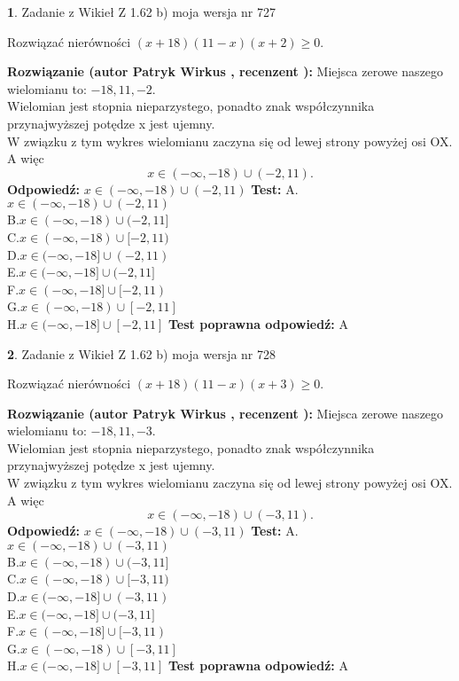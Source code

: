 \documentclass[12pt, a4paper]{article}
\theoremstyle{definition} %
\newtheorem{zad}{}
\newcommand{\zadStart}[1]{\begin{zad}#1\newline}
\newcommand{\zadStop}{\end{zad}}
\newcommand{\rozwStart}[2]{\noindent \textbf{Rozwiązanie (autor #1 , recenzent #2): }\newline}
\newcommand{\rozwStop}{\newline}
\newcommand{\odpStart}{\noindent \textbf{Odpowiedź:}\newline}
\newcommand{\odpStop}{\newline}
\newcommand{\testStart}{\noindent \textbf{Test:}\newline}
\newcommand{\testStop}{\newline}
\newcommand{\kluczStart}{\noindent \textbf{Test poprawna odpowiedź:}\newline}
\newcommand{\kluczStop}{\newline}
\begin{document}
\zadStart{Zadanie z Wikieł Z 1.62 b) moja wersja nr 727}

Rozwiązać nierówności $(x+18)(11-x)(x+2)\ge0$.
\zadStop
\rozwStart{Patryk Wirkus}{}
Miejsca zerowe naszego wielomianu to: $-18, 11, -2$.\\
Wielomian jest stopnia nieparzystego, ponadto znak współczynnika przy\linebreak najwyższej potędze x jest ujemny.\\ W związku z tym wykres wielomianu zaczyna się od lewej strony powyżej osi OX. A więc $$x \in (-\infty,-18) \cup (-2,11).$$
\rozwStop
\odpStart
$x \in (-\infty,-18) \cup (-2,11)$
\odpStop
\testStart
A.$x \in (-\infty,-18) \cup (-2,11)$\\
B.$x \in (-\infty,-18) \cup (-2,11]$\\
C.$x \in (-\infty,-18) \cup [-2,11)$\\
D.$x \in (-\infty,-18] \cup (-2,11)$\\
E.$x \in (-\infty,-18] \cup (-2,11]$\\
F.$x \in (-\infty,-18] \cup [-2,11)$\\
G.$x \in (-\infty,-18) \cup [-2,11]$\\
H.$x \in (-\infty,-18] \cup [-2,11]$
\testStop
\kluczStart
A
\kluczStop



\zadStart{Zadanie z Wikieł Z 1.62 b) moja wersja nr 728}

Rozwiązać nierówności $(x+18)(11-x)(x+3)\ge0$.
\zadStop
\rozwStart{Patryk Wirkus}{}
Miejsca zerowe naszego wielomianu to: $-18, 11, -3$.\\
Wielomian jest stopnia nieparzystego, ponadto znak współczynnika przy\linebreak najwyższej potędze x jest ujemny.\\ W związku z tym wykres wielomianu zaczyna się od lewej strony powyżej osi OX. A więc $$x \in (-\infty,-18) \cup (-3,11).$$
\rozwStop
\odpStart
$x \in (-\infty,-18) \cup (-3,11)$
\odpStop
\testStart
A.$x \in (-\infty,-18) \cup (-3,11)$\\
B.$x \in (-\infty,-18) \cup (-3,11]$\\
C.$x \in (-\infty,-18) \cup [-3,11)$\\
D.$x \in (-\infty,-18] \cup (-3,11)$\\
E.$x \in (-\infty,-18] \cup (-3,11]$\\
F.$x \in (-\infty,-18] \cup [-3,11)$\\
G.$x \in (-\infty,-18) \cup [-3,11]$\\
H.$x \in (-\infty,-18] \cup [-3,11]$
\testStop
\kluczStart
A
\kluczStop
\end{document}
